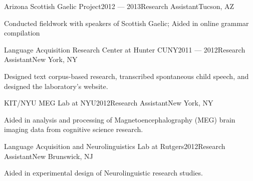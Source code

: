 \documentclass{resume} %
\begin{document}

\begin{rSubsection}{Arizona Scottish Gaelic Project}{2012 --- 2013}{Research Assistant}{Tucson, AZ}
\item Conducted fieldwork with speakers of Scottish Gaelic; Aided in online grammar compilation
\end{rSubsection}

\begin{rSubsection}{Language Acquisition Research Center at Hunter CUNY}{2011 --- 2012}{Research Assistant}{New York, NY}
\item Designed text corpus-based research, transcribed spontaneous child speech, and designed the laboratory's website.
\end{rSubsection}

\begin{rSubsection}{KIT/NYU MEG Lab at NYU}{2012}{Research Assistant}{New York, NY}
\item Aided in analysis and processing of Magnetoencephalography (MEG) brain imaging data from cognitive science research.
\end{rSubsection}

\begin{rSubsection}{Language Acquisition and Neurolinguistics Lab at Rutgers}{2012}{Research Assistant}{New Brunswick, NJ}
\item Aided in experimental design of Neurolinguistic research studies.
\end{rSubsection}





\end{document}
